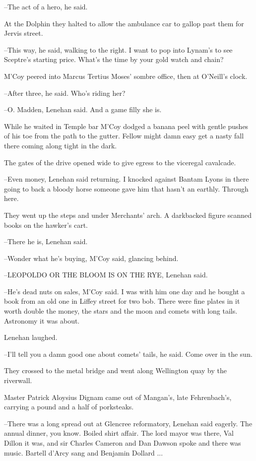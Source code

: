 --The act of a hero, he said.

At the Dolphin they halted to allow the ambulance car to gallop past
them for Jervis street.

--This way, he said, walking to the right. I want to pop into Lynam's to
see Sceptre's starting price. What's the time by your gold watch and
chain?

M'Coy peered into Marcus Tertius Moses' sombre office, then at
O'Neill's clock.

--After three, he said. Who's riding her?

--O. Madden, Lenehan said. And a game filly she is.

While he waited in Temple bar M'Coy dodged a banana peel with
gentle pushes of his toe from the path to the gutter. Fellow might damn
easy get a nasty fall there coming along tight in the dark.

The gates of the drive opened wide to give egress to the viceregal
cavalcade.

--Even money, Lenehan said returning. I knocked against Bantam Lyons in
there going to back a bloody horse someone gave him that hasn't an
earthly. Through here.

They went up the steps and under Merchants' arch. A darkbacked
figure scanned books on the hawker's cart.

--There he is, Lenehan said.

--Wonder what he's buying, M'Coy said, glancing behind.

--LEOPOLDO OR THE BLOOM IS ON THE RYE, Lenehan said.

--He's dead nuts on sales, M'Coy said. I was with him one day and he
bought a book from an old one in Liffey street for two bob. There were
fine plates in it worth double the money, the stars and the moon and
comets with long tails. Astronomy it was about.

Lenehan laughed.

--I'll tell you a damn good one about comets' tails, he said. Come over in
the sun.

They crossed to the metal bridge and went along Wellington quay by
the riverwall.

Master Patrick Aloysius Dignam came out of Mangan's, late
Fehrenbach's, carrying a pound and a half of porksteaks.

--There was a long spread out at Glencree reformatory, Lenehan said
eagerly. The annual dinner, you know. Boiled shirt affair. The lord mayor
was there, Val Dillon it was, and sir Charles Cameron and Dan Dawson
spoke and there was music. Bartell d'Arcy sang and Benjamin Dollard ...

